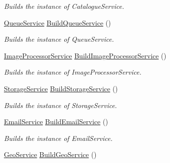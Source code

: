 \begin{DoxyCompactItemize}
\begin{DoxyCompactList}\small\item\em Builds the instance of Catalogue\+Service. \end{DoxyCompactList}\item 
\hyperlink{classcom_1_1shephertz_1_1app42_1_1paas_1_1sdk_1_1csharp_1_1message_1_1_queue_service}{Queue\+Service} \hyperlink{classcom_1_1shephertz_1_1app42_1_1paas_1_1sdk_1_1csharp_1_1_service_a_p_i_abab1e7d5d70aaaf4c70f4c63b8cdca4b}{Build\+Queue\+Service} ()
\begin{DoxyCompactList}\small\item\em Builds the instance of Queue\+Service. \end{DoxyCompactList}\item 
\hyperlink{classcom_1_1shephertz_1_1app42_1_1paas_1_1sdk_1_1csharp_1_1image_processor_1_1_image_processor_service}{Image\+Processor\+Service} \hyperlink{classcom_1_1shephertz_1_1app42_1_1paas_1_1sdk_1_1csharp_1_1_service_a_p_i_a211f56b5ec6b88fbd4311e5588f5459b}{Build\+Image\+Processor\+Service} ()
\begin{DoxyCompactList}\small\item\em Builds the instance of Image\+Processor\+Service. \end{DoxyCompactList}\item 
\hyperlink{classcom_1_1shephertz_1_1app42_1_1paas_1_1sdk_1_1csharp_1_1storage_1_1_storage_service}{Storage\+Service} \hyperlink{classcom_1_1shephertz_1_1app42_1_1paas_1_1sdk_1_1csharp_1_1_service_a_p_i_a6095c7d2d004811386bfa8fec4c936de}{Build\+Storage\+Service} ()
\begin{DoxyCompactList}\small\item\em Builds the instance of Storage\+Service. \end{DoxyCompactList}\item 
\hyperlink{classcom_1_1shephertz_1_1app42_1_1paas_1_1sdk_1_1csharp_1_1email_1_1_email_service}{Email\+Service} \hyperlink{classcom_1_1shephertz_1_1app42_1_1paas_1_1sdk_1_1csharp_1_1_service_a_p_i_a72523c209e434971042ccc9545e2d83f}{Build\+Email\+Service} ()
\begin{DoxyCompactList}\small\item\em Builds the instance of Email\+Service. \end{DoxyCompactList}\item 
\hyperlink{classcom_1_1shephertz_1_1app42_1_1paas_1_1sdk_1_1csharp_1_1geo_1_1_geo_service}{Geo\+Service} \hyperlink{classcom_1_1shephertz_1_1app42_1_1paas_1_1sdk_1_1csharp_1_1_service_a_p_i_a0546974e603183b01afda171e3dbb3a3}{Build\+Geo\+Service} ()

\end{DoxyCompactItemize}
